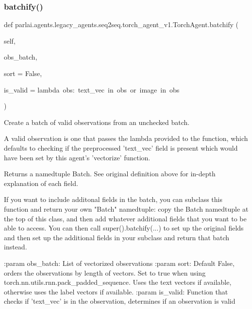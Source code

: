 \subsubsection{\texorpdfstring{batchify()}{batchify()}}
{\footnotesize\ttfamily def parlai.\+agents.\+legacy\+\_\+agents.\+seq2seq.\+torch\+\_\+agent\+\_\+v1.\+Torch\+Agent.\+batchify (\begin{DoxyParamCaption}\item[{}]{self,  }\item[{}]{obs\+\_\+batch,  }\item[{}]{sort = {\ttfamily False},  }\item[{}]{is\+\_\+valid = {\ttfamily lambda~obs\+:~\textquotesingle{}text\+\_\+vec\textquotesingle{}~in~obs~or~\textquotesingle{}image\textquotesingle{}~in~obs} }\end{DoxyParamCaption})}

\begin{DoxyVerb}Create a batch of valid observations from an unchecked batch.

A valid observation is one that passes the lambda provided to the
function, which defaults to checking if the preprocessed 'text_vec'
field is present which would have been set by this agent's 'vectorize'
function.

Returns a namedtuple Batch. See original definition above for in-depth
explanation of each field.

If you want to include additonal fields in the batch, you can subclass
this function and return your own "Batch" namedtuple: copy the Batch
namedtuple at the top of this class, and then add whatever additional
fields that you want to be able to access. You can then call
super().batchify(...) to set up the original fields and then set up the
additional fields in your subclass and return that batch instead.

:param obs_batch: List of vectorized observations
:param sort:      Default False, orders the observations by length of
          vectors. Set to true when using
          torch.nn.utils.rnn.pack_padded_sequence.
          Uses the text vectors if available, otherwise uses
          the label vectors if available.
:param is_valid:  Function that checks if 'text_vec' is in the
          observation, determines if an observation is valid
\end{DoxyVerb}
 \mbox{\label{classparlai_1_1agents_1_1legacy__agents_1_1seq2seq_1_1torch__agent__v1_1_1TorchAgent_abc77ad96264e7597c46bc001a9a6af90}} 
